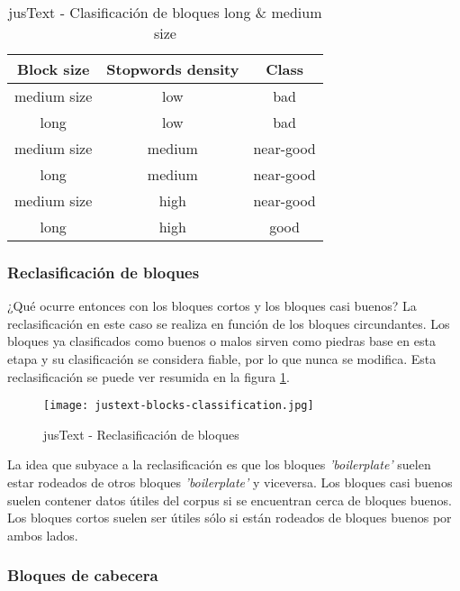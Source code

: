 \begin{table}[h]
  \begin{center}
  \begin{tabular}{| c | c | c |}
  \hline \textbf{Block size} & \textbf{Stopwords density} & \textbf{Class} \\ \hline
  medium size & low & bad \\ \hline
  long & low & bad \\ \hline
  medium size & medium & near-good \\ \hline
  long & medium & near-good \\ \hline
  medium size & high & near-good \\ \hline
  long & high & good \\ \hline
  \end{tabular}
  \caption{jusText - Clasificación de bloques long \& medium size}
  \label{tab:justext - clasificacion de bloques long & medium size}
  \end{center}
\end{table}

\subsubsection{Reclasificación de bloques}
\label{subsubsec:reclasificacion de bloques}

¿Qué ocurre entonces con los bloques cortos y los bloques casi buenos? La reclasificación en este caso se 
realiza en función de los bloques circundantes. Los bloques ya clasificados como buenos o malos sirven 
como piedras base en esta etapa y su clasificación se considera fiable, por lo que nunca se modifica. Esta 
reclasificación se puede ver resumida en la figura \ref{img:justext - reclasificacion de bloques}.

\begin{figure}[tphb]
  \centering
  \texttt{[image: justext-blocks-classification.jpg]}
  \caption{jusText - Reclasificación de bloques}
  \label{img:justext - reclasificacion de bloques}
\end{figure}

La idea que subyace a la reclasificación es que los bloques \emph{'boilerplate'} suelen estar rodeados de 
otros bloques \emph{'boilerplate'} y viceversa. Los bloques casi buenos suelen contener datos útiles del 
corpus si se encuentran cerca de bloques buenos. Los bloques cortos suelen ser útiles sólo si están rodeados 
de bloques buenos por ambos lados.

\subsubsection{Bloques de cabecera}
\label{subsubsec:bloques de cabecera}

